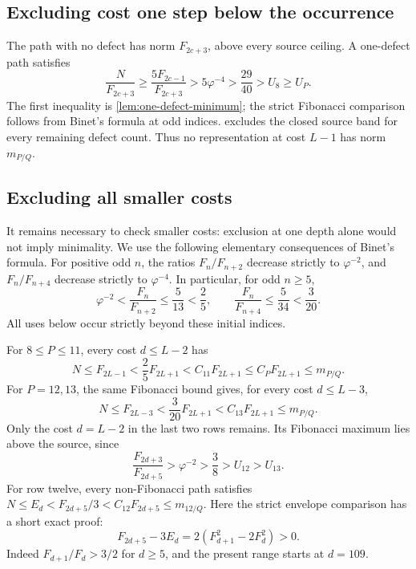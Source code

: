 \subsection{Excluding cost one step below the occurrence}\label{sec:one-step-below}

The path with no defect has norm $F_{2c+3}$, above every source ceiling.
A one-defect path satisfies
$$
 \frac{N}{F_{2c+3}}\geqslant
 \frac{5F_{2c-1}}{F_{2c+3}}
 >5\varphi^{-4}>\frac{29}{40}>U_8\geqslant U_P.
$$
The first inequality is \cref{lem:one-defect-minimum}; the strict
Fibonacci comparison follows from Binet's formula at odd indices.
 excludes the closed source band for every
remaining defect count. Thus no representation at cost $L-1$ has norm
$m_{P/Q}$.

\subsection{Excluding all smaller costs}

It remains necessary to check smaller costs: exclusion at one depth
alone would not imply minimality. We use the following elementary
consequences of Binet's formula. For positive odd $n$, the ratios
$F_n/F_{n+2}$ decrease strictly to $\varphi^{-2}$, and
$F_n/F_{n+4}$ decrease strictly to $\varphi^{-4}$. In particular,
for odd $n\geqslant5$,
\begin{equation}\label{eq:coarse-fibonacci-ratios}
 \varphi^{-2}<\frac{F_n}{F_{n+2}}\leqslant\frac5{13}<\frac25,
 \qquad
 \frac{F_n}{F_{n+4}}\leqslant\frac5{34}<\frac3{20}.
\end{equation}
All uses below occur strictly beyond these initial indices.

For $8\leqslant P\leqslant11$, every cost $d\leqslant L-2$ has
$$
 N\leqslant F_{2L-1}
 <\frac25F_{2L+1}
 <C_{11}F_{2L+1}\leqslant C_PF_{2L+1}\leqslant m_{P/Q}.
$$
For $P=12,13$, the same Fibonacci bound gives, for every cost $d\leqslant L-3$,
$$
 N\leqslant F_{2L-3}
 <\frac3{20}F_{2L+1}
 <C_{13}F_{2L+1}\leqslant m_{P/Q}.
$$
Only the cost $d=L-2$ in the last two rows remains. Its Fibonacci
maximum lies above the source, since
$$
 \frac{F_{2d+3}}{F_{2d+5}}>\varphi^{-2}>\frac38>U_{12}>U_{13}.
$$
For row twelve, every non-Fibonacci path satisfies
$N\leqslant E_d<F_{2d+5}/3<C_{12}F_{2d+5}\leqslant m_{12/Q}$.
Here the strict envelope comparison has a short exact proof:
$$
 F_{2d+5}-3E_d=2(F_{d+1}^2-2F_d^2)>0.
$$
Indeed $F_{d+1}/F_d>3/2$ for $d\geqslant5$, and the present range
starts at $d=109$.

